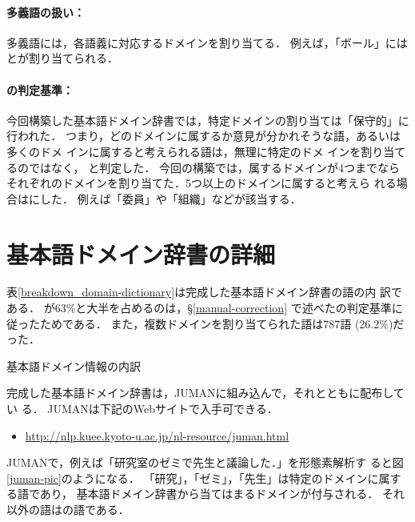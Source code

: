 \documentclass[japanese]{jnlp_1.4}
\newcommand{\dom}[1]{}
\begin{document}
\paragraph{多義語の扱い：}

多義語には，各語義に対応するドメインを割り当てる．
例えば，「ボール」には\dom{スポーツ}と\dom{料理・食事}が割り当てられる．

\paragraph{\dom{ドメイン無し}の判定基準：}

今回構築した基本語ドメイン辞書では，特定ドメインの割り当ては「保守的」に
行われた．
つまり，どのドメインに属するか意見が分かれそうな語，あるいは多くのドメ
インに属すると考えられる語は，無理に特定のドメ
インを割り当てるのではなく，
\dom{ドメイン無し}と判定した．
今回の構築では，属するドメインが4つまでなら
それぞれのドメインを割り当てた．5つ以上のドメインに属すると考えら
れる場合は\dom{ドメイン無し}にした．
例えば「委員」や「組織」などが該当する．


\section{基本語ドメイン辞書の詳細 \label{dic-spec}}

表\ref{breakdown_domain-dictionary}は完成した基本語ドメイン辞書の語の内
訳である．
\dom{ドメイン無し}が63\%と大半を占めるのは，\S\ref{manual-correction}
で述べた\dom{ドメイン無し}の判定基準に従ったためである．
また，複数ドメインを割り当てられた語は787語 (26.2\%)だった．


\begin{table}[b]
\caption{基本語ドメイン情報の内訳}
\label{breakdown_domain-dictionary}

\end{table}

完成した基本語ドメイン辞書は，JUMANに組み込んで，それとともに配布してい
る．
JUMANは下記のWebサイトで入手可できる．

\begin{itemize}
 \item \url{http://nlp.kuee.kyoto-u.ac.jp/nl-resource/juman.html}
\end{itemize}

JUMANで，例えば「研究室のゼミで先生と議論した．」を形態素解析す
ると図\ref{juman-pic}のようになる．
「研究」，「ゼミ」，「先生」は特定のドメインに属する語であり，
基本語ドメイン辞書から当てはまるドメインが付与される．
それ以外の語は\dom{ドメイン無し}の語である．
\end{document}
